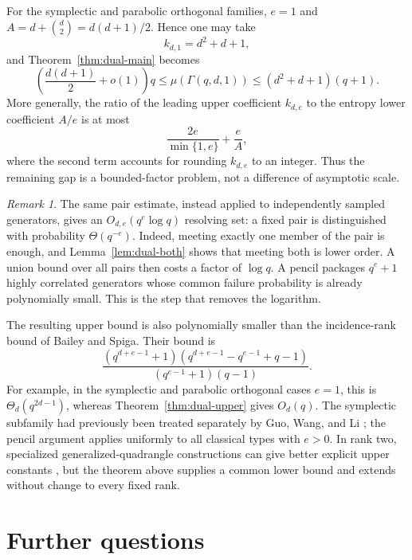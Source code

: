 \documentclass[11pt]{article}
\theoremstyle{definition}
\theoremstyle{remark}
\newtheorem{remark}[theorem]{Remark}
\begin{document}
For the symplectic and parabolic orthogonal families, $e=1$ and
$A=d+\binom d2=d(d+1)/2$.  Hence one may take
\[
        k_{d,1}=d^2+d+1,
\]
and Theorem~\ref{thm:dual-main} becomes
\[
        \left(\frac{d(d+1)}2+o(1)\right)q
        \leq \mu(\Gamma(q,d,1))
        \leq (d^2+d+1)(q+1).
\]
More generally, the ratio of the leading upper coefficient $k_{d,e}$ to
the entropy lower coefficient $A/e$ is at most
\[
        \frac{2e}{\min\{1,e\}}+\frac{e}{A},
\]
where the second term accounts for rounding $k_{d,e}$ to an integer.  Thus
the remaining gap is a bounded-factor problem, not a difference of
asymptotic scale.

\begin{remark}
The same pair estimate, instead applied to independently sampled 
generators, gives
an $O_{d,e}(q^e\log q)$ resolving set: a fixed pair is distinguished with
probability $\Theta(q^{-e})$.  Indeed, meeting exactly one member of the
pair is enough, and Lemma~\ref{lem:dual-both} shows that meeting both is
lower order.  A union bound over all pairs then costs a factor of $\log q$.
A pencil packages $q^e+1$ highly correlated
generators
whose common failure probability is already polynomially small.  This is
the step that removes the logarithm.
\end{remark}

The resulting upper bound is also polynomially smaller than the
incidence-rank bound of Bailey and Spiga.  Their bound is
\[
        \frac{(q^{d+e-1}+1)
        (q^{d+e-1}-q^{e-1}+q-1)}
        {(q^{e-1}+1)(q-1)}.
\]
For example, in the symplectic and parabolic orthogonal cases $e=1$, this
is $\Theta_d(q^{2d-1})$, whereas Theorem~\ref{thm:dual-upper} gives
$O_d(q)$.  The symplectic subfamily had previously been treated separately
by Guo, Wang, and Li \cite{GuoWangLiSymplectic}; the pencil argument applies
uniformly to all classical types with $e>0$.  In rank two, specialized 
generalized-quadrangle constructions can give
better explicit upper constants \cite[Sec.~4]{BaileySpiga}, but the 
theorem
above supplies a common lower bound and extends without change to every
fixed rank.


\section{Further questions}\label{sec:questions}
\end{document}
